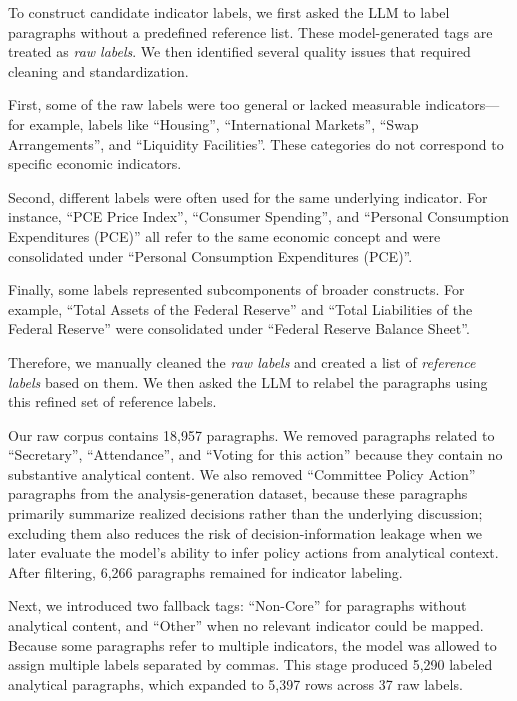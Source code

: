 To construct candidate indicator labels, we first asked the LLM to label paragraphs without a predefined reference list. These model-generated tags are treated as \textit{raw labels}. We then identified several quality issues that required cleaning and standardization.

First, some of the raw labels were too general or lacked measurable indicators—for example, labels like ``Housing'', ``International Markets'', ``Swap Arrangements'', and ``Liquidity Facilities''. These categories do not correspond to specific economic indicators.

Second, different labels were often used for the same underlying indicator. For instance, ``PCE Price Index'', ``Consumer Spending'', and ``Personal Consumption Expenditures (PCE)'' all refer to the same economic concept and were consolidated under ``Personal Consumption Expenditures (PCE)''.


Finally, some labels represented subcomponents of broader constructs. For example, ``Total Assets of the Federal Reserve'' and ``Total Liabilities of the Federal Reserve'' were consolidated under ``Federal Reserve Balance Sheet''.


Therefore, we manually cleaned the \textit{raw labels} and created a list of \textit{reference labels} based on them. We then asked the LLM to relabel the paragraphs using this refined set of reference labels.

Our raw corpus contains 18,957 paragraphs. We removed paragraphs related to ``Secretary'', ``Attendance'', and ``Voting for this action'' because they contain no substantive analytical content. We also removed ``Committee Policy Action'' paragraphs from the analysis-generation dataset, because these paragraphs primarily summarize realized decisions rather than the underlying discussion; excluding them also reduces the risk of decision-information leakage when we later evaluate the model’s ability to infer policy actions from analytical context. After filtering, 6,266 paragraphs remained for indicator labeling.



Next, we introduced two fallback tags: ``Non-Core'' for paragraphs without analytical content, and ``Other'' when no relevant indicator could be mapped. Because some paragraphs refer to multiple indicators, the model was allowed to assign multiple labels separated by commas. This stage produced 5,290 labeled analytical paragraphs, which expanded to 5,397 rows across 37 raw labels. 


